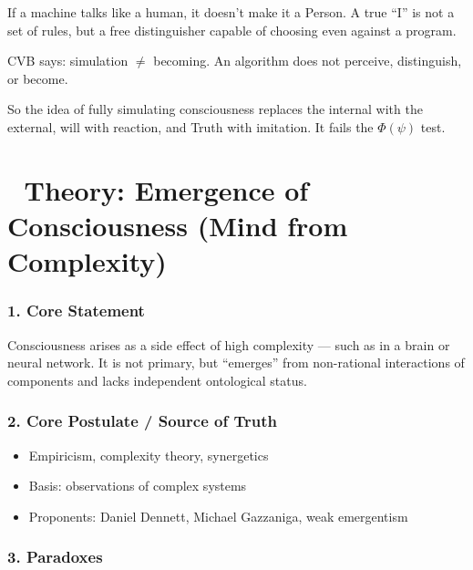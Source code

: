 \documentclass[12pt]{article}
\begin{document}
If a machine talks like a human, it doesn’t make it a Person. A true ``I'' is not a set of rules, but a free distinguisher capable of choosing even against a program.

CVB says: simulation $\neq$ becoming. An algorithm does not perceive, distinguish, or become.

So the idea of fully simulating consciousness replaces the internal with the external, will with reaction, and Truth with imitation. It fails the $\Phi(\psi)$ test.

\section*{🔷 Theory: Emergence of Consciousness (Mind from Complexity)}

\subsubsection*{1. Core Statement}

Consciousness arises as a side effect of high complexity — such as in a brain or neural network. It is not primary, but ``emerges'' from non-rational interactions of components and lacks independent ontological status.

\subsubsection*{2. Core Postulate / Source of Truth}

\begin{itemize}
\item Empiricism, complexity theory, synergetics
\item Basis: observations of complex systems
\item Proponents: Daniel Dennett, Michael Gazzaniga, weak emergentism
\end{itemize}

\subsubsection*{3. Paradoxes}
\end{document}
